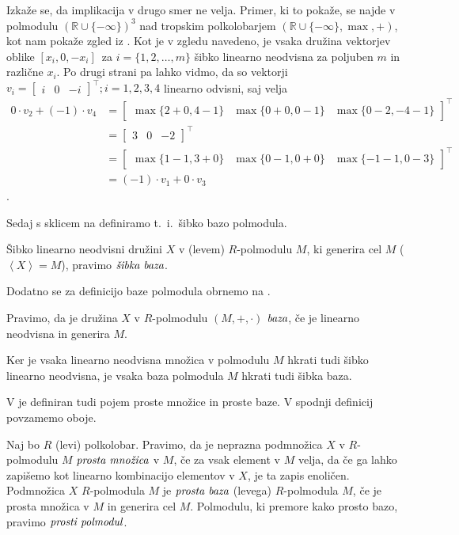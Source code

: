 \documentclass[mat1]{fmfdelo}
\newcommand{\R}{\mathbb{R}}
\newcommand{\pojem}[1]{\ensuremath{\emph{#1}}}
\newcommand{\Gen}[1]{\ensuremath{\left<{#1}\right>}}
\begin{document}
Izkaže se, da implikacija v drugo smer ne velja. Primer, ki to pokaže, se najde v polmodulu $(\R\cup\{-\infty\})^3$ nad tropskim polkolobarjem $(\R\cup\{-\infty\}, \max, +)$, kot nam pokaže zgled iz \cite[zgled 2.\ 14.]{bib:AkianTropSemi}. Kot je v zgledu navedeno, je vsaka družina vektorjev oblike $[x_i, 0, -x_i]$~za $i = \{1, 2, \ldots, m\}$ šibko linearno neodvisna za poljuben $m$ in različne $x_i$. Po drugi strani pa lahko vidmo, da so vektorji $v_i = \begin{bmatrix}i & 0 & -i\end{bmatrix}^\top; i = 1, 2, 3, 4$ linearno odvisni, saj velja \begin{align*}0\cdot v_2 + (-1)\cdot v_4 &= \begin{bmatrix}\max\{2+0,4-1\} &\max\{0+0,0-1\}&\max\{0-2, -4-1\} \end{bmatrix}^\top \\ &= \begin{bmatrix}3 & 0 & -2\end{bmatrix}^\top\\ &= \begin{bmatrix}\max\{1-1, 3+0\}&\max\{0-1, 0+0\}&\max\{-1-1, 0-3\}\end{bmatrix}^\top \\ &= (-1)\cdot v_1 + 0\cdot v_3\end{align*}.

Sedaj s sklicem na \cite[Definicija 2.~4.]{bib:Tanbase} definiramo t.~i.~šibko bazo polmodula.

\begin{definicija}\label{def:polmodbaza}
	Šibko linearno neodvisni družini $X$ v (levem) $R$-polmodulu $M$, ki generira cel $M$ ($\Gen{X} = M$), pravimo \pojem{šibka baza}.
\end{definicija}

Dodatno se za definicijo baze polmodula obrnemo na \cite[poglavje 5, definicija 2.\ 5.\ 2.]{bib:Gondran}.

\begin{definicija}
	Pravimo, da je družina $X$ v $R$-polmodulu $(M, +, \cdot)$ \pojem{baza}, če je linearno neodvisna in generira $M$.
\end{definicija}

\begin{opomba}
Ker je vsaka linearno neodvisna množica v polmodulu $M$ hkrati tudi šibko linearno neodvisna, je vsaka baza polmodula $M$ hkrati tudi šibka baza.
\end{opomba}

V \cite[definicija 2.~3.]{bib:Tanbase} je definiran tudi pojem proste množice in proste baze. V spodnji definicij povzamemo oboje.
\begin{definicija}
	Naj bo $R$ (levi) polkolobar. Pravimo, da je neprazna podmnožica $X$ v $R$-polmodulu $M$ \pojem{prosta množica} v $M$, če za vsak element v $M$ velja, da če ga lahko zapišemo kot linearno kombinacijo elementov v $X$, je ta zapis enoličen.
	Podmnožica $X$ $R$-polmodula $M$ je \pojem{prosta baza} (levega) $R$-polmodula $M$, če je prosta množica v $M$ in generira cel $M$. Polmodulu, ki premore kako prosto bazo, pravimo \pojem{prosti polmodul}.
\end{definicija}
\end{document}
